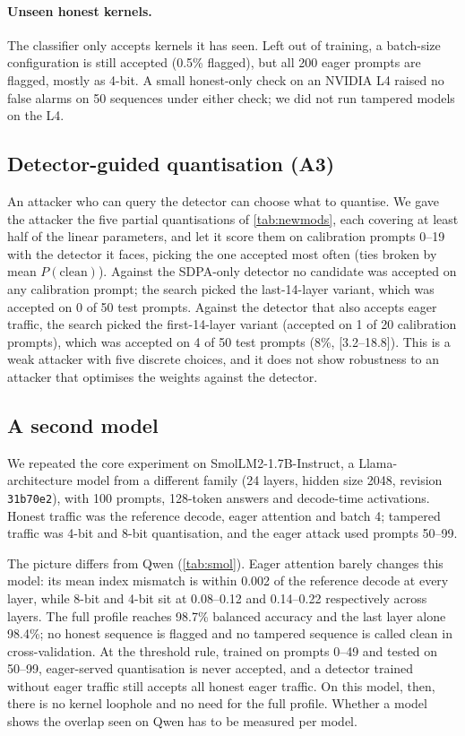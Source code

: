 \documentclass[11pt]{article}
\newcommand{\ci}[2]{{\scriptsize[#1--#2]}}
\begin{document}
\paragraph{Unseen honest kernels.}
The classifier only accepts kernels it has seen.
Left out of training, a batch-size configuration is still accepted (0.5\% flagged), but all 200 eager prompts are flagged, mostly as 4-bit.
A small honest-only check on an NVIDIA L4 raised no false alarms on 50 sequences under either check; we did not run tampered models on the L4.

\subsection{Detector-guided quantisation (A3)}
\label{sec:res-aware}

An attacker who can query the detector can choose what to quantise.
We gave the attacker the five partial quantisations of \cref{tab:newmods}, each covering at least half of the linear parameters, and let it score them on calibration prompts 0--19 with the detector it faces, picking the one accepted most often (ties broken by mean $P(\text{clean})$).
Against the SDPA-only detector no candidate was accepted on any calibration prompt; the search picked the last-14-layer variant, which was accepted on 0 of 50 test prompts.
Against the detector that also accepts eager traffic, the search picked the first-14-layer variant (accepted on 1 of 20 calibration prompts), which was accepted on 4 of 50 test prompts (8\%, \ci{3.2}{18.8}).
This is a weak attacker with five discrete choices, and it does not show robustness to an attacker that optimises the weights against the detector.


\subsection{A second model}
\label{sec:res-smol}

We repeated the core experiment on SmolLM2-1.7B-Instruct, a Llama-architecture model from a different family (24 layers, hidden size 2048, revision \texttt{31b70e2}), with 100 prompts, 128-token answers and decode-time activations.
Honest traffic was the reference decode, eager attention and batch 4; tampered traffic was 4-bit and 8-bit quantisation, and the eager attack used prompts 50--99.

The picture differs from Qwen (\cref{tab:smol}).
Eager attention barely changes this model: its mean index mismatch is within 0.002 of the reference decode at every layer, while 8-bit and 4-bit sit at 0.08--0.12 and 0.14--0.22 respectively across layers.
The full profile reaches 98.7\% balanced accuracy and the last layer alone 98.4\%; no honest sequence is flagged and no tampered sequence is called clean in cross-validation.
At the threshold rule, trained on prompts 0--49 and tested on 50--99, eager-served quantisation is never accepted, and a detector trained without eager traffic still accepts all honest eager traffic.
On this model, then, there is no kernel loophole and no need for the full profile.
Whether a model shows the overlap seen on Qwen has to be measured per model.
\end{document}
